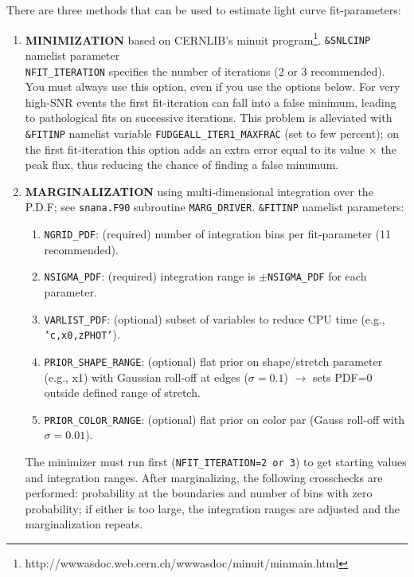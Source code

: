 \documentclass[12pt]{article}
\newcommand{\wwwMINUIT}{http://wwwasdoc.web.cern.ch/wwwasdoc/minuit/minmain.html}
\newcommand{\minuit}{{\sc minuit}}
\begin{document}
There are three methods that can be used to estimate
light curve fit-parameters: 
%
\begin{enumerate} 
 \item {\bf MINIMIZATION} based on CERNLIB's 
   {\minuit} program\footnote{\wwwMINUIT}.
   {\tt \&SNLCINP} namelist parameter \\ {\tt NFIT\_ITERATION} 
   specifies the number of iterations (2 or 3  recommended).
   You must always use this option, even if you use the 
   options below. For very high-SNR events the first fit-iteration
   can fall into a false minimum, leading to pathological
   fits on successive iterations. This problem is
   alleviated with {\tt \&FITINP} namelist variable
   \verb|FUDGEALL_ITER1_MAXFRAC| (set to few percent);
   on the first fit-iteration this option adds
   an extra error equal to its value $\times$ the peak flux,
   thus reducing the chance of finding a false minumum.
%
 \item {\bf MARGINALIZATION} using multi-dimensional integration
   over the P.D.F; see {\tt snana.F90} subroutine \verb|MARG_DRIVER|.
   {\tt \&FITINP} namelist parameters:
   \begin{enumerate}[noitemsep]
     \item \verb|NGRID_PDF|:  (required) number of integration bins per fit-parameter (11 recommended).
     \item \verb|NSIGMA_PDF|: (required) integration range is $\pm$\verb|NSIGMA_PDF| for each parameter.
     \item \verb|VARLIST_PDF|: (optional) subset of variables to reduce CPU time 
            (e.g., {\tt 'c,x0,zPHOT'}).
     \item \verb|PRIOR_SHAPE_RANGE|: (optional) flat prior on shape/stretch parameter
               (e.g., x1) with Gaussian roll-off at edges ($\sigma=0.1$)
               $\to$ sets PDF=0 outside defined range of stretch.
     \item \verb|PRIOR_COLOR_RANGE|: (optional) flat prior on color par
               (Gauss roll-off with $\sigma=0.01$).
   \end{enumerate}
   The minimizer must run first (\verb|NFIT_ITERATION=2 or 3|)
   to get starting values and integration ranges.
   After marginalizing, the following crosschecks are performed:
   probability at the  boundaries and number of bins with zero 
   probability; if either is too large, the integration ranges
   are adjusted and the marginalization repeats.
%
\end{enumerate} 
\end{document}
